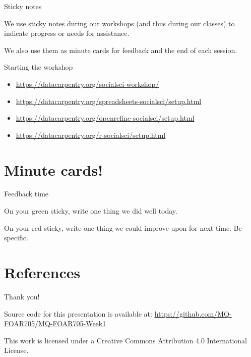 \documentclass[aspectratio=169, 11pt]{beamer} %
\begin{document}
\begin{frame}{Sticky notes}

We use sticky notes during our workshops (and thus during our classes) to indicate progress or needs for assistance. 

We also use them as minute cards for feedback and the end of each session. 

\end{frame}
\begin{frame}{Starting the workshop}
    \begin{itemize}
        \item \url{https://datacarpentry.org/socialsci-workshop/}
        \item \url{https://datacarpentry.org/spreadsheets-socialsci/setup.html}
        \item \url{https://datacarpentry.org/openrefine-socialsci/setup.html}
        \item \url{https://datacarpentry.org/r-socialsci/setup.html}
    \end{itemize}
\end{frame}


% 



\section{Minute cards!}
\begin{frame}{Feedback time}

On your green sticky, write one thing we did well today.

On your red sticky, write one thing we could improve upon for next time. Be specific. 

\end{frame}

\section{References}

\begin{multicols}{2}[]


\end{multicols}


  
%   
%   


\begin{frame}{Thank you!}


Source code for this presentation is available at: \url{https://github.com/MQ-FOAR705/MQ-FOAR705-Week1}

This work is licensed under a Creative Commons Attribution 4.0 International License.

\end{frame}
\end{document}
